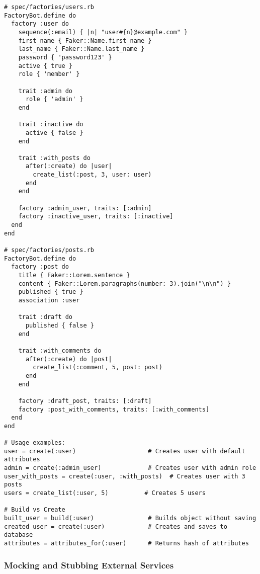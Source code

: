 \documentclass[12pt,a4paper]{article}
\begin{document}
\begin{lstlisting}
# spec/factories/users.rb
FactoryBot.define do
  factory :user do
    sequence(:email) { |n| "user#{n}@example.com" }
    first_name { Faker::Name.first_name }
    last_name { Faker::Name.last_name }
    password { 'password123' }
    active { true }
    role { 'member' }

    trait :admin do
      role { 'admin' }
    end

    trait :inactive do
      active { false }
    end

    trait :with_posts do
      after(:create) do |user|
        create_list(:post, 3, user: user)
      end
    end

    factory :admin_user, traits: [:admin]
    factory :inactive_user, traits: [:inactive]
  end
end

# spec/factories/posts.rb
FactoryBot.define do
  factory :post do
    title { Faker::Lorem.sentence }
    content { Faker::Lorem.paragraphs(number: 3).join("\n\n") }
    published { true }
    association :user

    trait :draft do
      published { false }
    end

    trait :with_comments do
      after(:create) do |post|
        create_list(:comment, 5, post: post)
      end
    end

    factory :draft_post, traits: [:draft]
    factory :post_with_comments, traits: [:with_comments]
  end
end

# Usage examples:
user = create(:user)                    # Creates user with default attributes
admin = create(:admin_user)             # Creates user with admin role
user_with_posts = create(:user, :with_posts)  # Creates user with 3 posts
users = create_list(:user, 5)          # Creates 5 users

# Build vs Create
built_user = build(:user)               # Builds object without saving
created_user = create(:user)            # Creates and saves to database
attributes = attributes_for(:user)      # Returns hash of attributes
\end{lstlisting}

\subsubsection{Mocking and Stubbing External Services}
\end{document}
